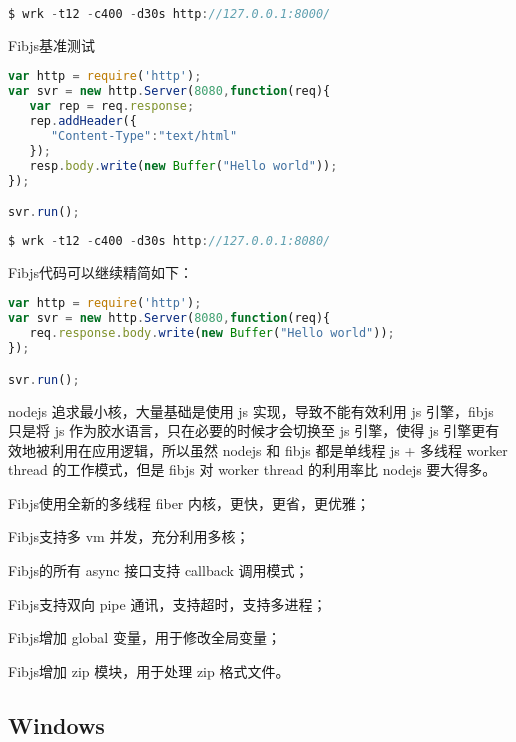 \begin{lstlisting}[language=JavaScript]
$ wrk -t12 -c400 -d30s http://127.0.0.1:8000/
\end{lstlisting}


\begin{example}
Fibjs基准测试
\begin{lstlisting}[language=JavaScript]
var http = require('http');
var svr = new http.Server(8080,function(req){
   var rep = req.response;
   rep.addHeader({
      "Content-Type":"text/html"   
   });
   resp.body.write(new Buffer("Hello world"));
});

svr.run();
\end{lstlisting}
\end{example}



\begin{lstlisting}[language=JavaScript]
$ wrk -t12 -c400 -d30s http://127.0.0.1:8080/
\end{lstlisting}

Fibjs代码可以继续精简如下：

\begin{lstlisting}[language=JavaScript]
var http = require('http');
var svr = new http.Server(8080,function(req){
   req.response.body.write(new Buffer("Hello world"));
});

svr.run();
\end{lstlisting}

nodejs 追求最小核，大量基础是使用 js 实现，导致不能有效利用 js 引擎，fibjs 只是将 js 作为胶水语言，只在必要的时候才会切换至 js 引擎，使得 js 引擎更有效地被利用在应用逻辑，所以虽然 nodejs 和 fibjs 都是单线程 js + 多线程 worker thread 的工作模式，但是 fibjs 对 worker thread 的利用率比 nodejs 要大得多。


\begin{compactitem}
\item Fibjs使用全新的多线程 fiber 内核，更快，更省，更优雅；
\item Fibjs支持多 vm 并发，充分利用多核；
\item Fibjs的所有 async 接口支持 callback 调用模式；
\item Fibjs支持双向 pipe 通讯，支持超时，支持多进程；
\item Fibjs增加 global 变量，用于修改全局变量；
\item Fibjs增加 zip 模块，用于处理 zip 格式文件。
\end{compactitem}

\subsection{Windows}

